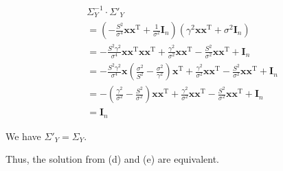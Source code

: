 \documentclass[11pt]{article}
\begin{document}
\begin{enumerate}
\begin{enumerate}[label=(\alph*)]
$$
\begin{aligned}
&\Sigma^{-1}_Y \cdot \Sigma'_Y \\
&= ( -\frac{S^2}{\sigma^4} \textbf{x}\textbf{x}^{\mathrm{T}}+\frac{1}{\sigma^2}\textbf{I}_n)(\gamma^2 \textbf{x}\textbf{x}^{\mathrm{T}} + \sigma^2\textbf{I}_n)\\
& = -\frac{S^2\gamma^2}{\sigma^4}\textbf{x}\textbf{x}^{\mathrm{T}}\textbf{x}\textbf{x}^{\mathrm{T}} + \frac{\gamma^2}{\sigma^2}\textbf{x}\textbf{x}^{\mathrm{T}} -\frac{S^2}{\sigma^2}\textbf{x}\textbf{x}^{\mathrm{T}} + \textbf{I}_n\\
& = -\frac{S^2\gamma^2}{\sigma^4}\textbf{x}(\frac{\sigma^2}{S^2}-\frac{\sigma^2}{\gamma^2})\textbf{x}^{\mathrm{T}} + \frac{\gamma^2}{\sigma^2}\textbf{x}\textbf{x}^{\mathrm{T}} -\frac{S^2}{\sigma^2}\textbf{x}\textbf{x}^{\mathrm{T}} + \textbf{I}_n\label{eq:pf1}\\
& = -(\frac{\gamma^2}{\sigma^2}-\frac{S^2}{\sigma^2})\textbf{x}\textbf{x}^{\mathrm{T}}+ \frac{\gamma^2}{\sigma^2}\textbf{x}\textbf{x}^{\mathrm{T}} -\frac{S^2}{\sigma^2}\textbf{x}\textbf{x}^{\mathrm{T}} + \textbf{I}_n\\
& = \textbf{I}_n
\end{aligned}
$$

We have $\Sigma'_Y = \Sigma_Y$.

Thus, the solution from (d) and (e) are equivalent.









\end{enumerate}
\end{enumerate}
\end{document}

